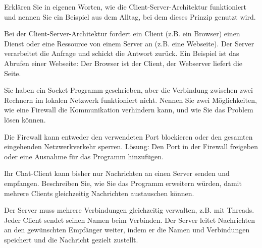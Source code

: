 \begin{myexercise}

    Erklären Sie in eigenen Worten, wie die Client-Server-Architektur funktioniert und nennen Sie ein Beispiel aus dem Alltag, bei dem dieses Prinzip genutzt wird.

    \begin{myanswer}
        Bei der Client-Server-Architektur fordert ein Client (z.B. ein Browser) einen Dienst oder eine Ressource von einem Server an (z.B. eine Webseite). Der Server verarbeitet die Anfrage und schickt die Antwort zurück. Ein Beispiel ist das Abrufen einer Webseite: Der Browser ist der Client, der Webserver liefert die Seite.
    \end{myanswer}
\end{myexercise}

\begin{myexercise}

    Sie haben ein Socket-Programm geschrieben, aber die Verbindung zwischen zwei Rechnern im lokalen Netzwerk funktioniert nicht. Nennen Sie zwei Möglichkeiten, wie eine Firewall die Kommunikation verhindern kann, und wie Sie das Problem lösen können.

    \begin{myanswer}
        Die Firewall kann entweder den verwendeten Port blockieren oder den gesamten eingehenden Netzwerkverkehr sperren. Lösung: Den Port in der Firewall freigeben oder eine Ausnahme für das Programm hinzufügen.
    \end{myanswer}
\end{myexercise}

\begin{myexercise}

    Ihr Chat-Client kann bisher nur Nachrichten an einen Server senden und empfangen. Beschreiben Sie, wie Sie das Programm erweitern würden, damit mehrere Clients gleichzeitig Nachrichten austauschen können.

    \begin{myanswer}
        Der Server muss mehrere Verbindungen gleichzeitig verwalten, z.B. mit Threads. Jeder Client sendet seinen Namen beim Verbinden. Der Server leitet Nachrichten an den gewünschten Empfänger weiter, indem er die Namen und Verbindungen speichert und die Nachricht gezielt zustellt.
    \end{myanswer}
\end{myexercise}

